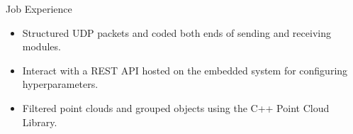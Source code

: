 \begin{rubric}{Job Experience}
\begin{itemize}
	\setlength{\itemsep}{\CVItemizeSpacing}
	\item Structured UDP packets and coded both ends of sending and receiving modules.
	\item Interact with a REST API hosted on the embedded system for configuring hyperparameters.
	\item Filtered point clouds and grouped objects using the C++ Point Cloud Library.  
\end{itemize}
\begin{comment}
%
%
\entry*[] \textbf{Creative Edge LLC} \hfill \textit{Software Engineer} \newline
08.2017 -- 09.2018 \hfill Denver, USA \newline
\vspace{\CVItemizeHeaderSpacing} \begin{itemize} %
	\setlength{\itemsep}{\CVItemizeSpacing}
	\item Developed applications for cryptocurrency mining in both Windows and Linux.  
	\item Wrote software managing OS drivers, system configurations, and 3rd party tools.
\end{itemize}
\end{comment}

\end{rubric}

